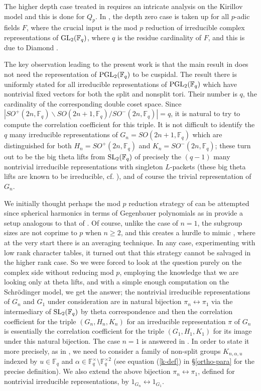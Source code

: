 \documentclass[12pt]{amsart}
\theoremstyle{definition}
\theoremstyle{remark}
\begin{document}
The higher depth case treated in \cite[\S 7]{bhko24} requires an intricate analysis on the Kirillov model and this is done for $Q_p$. In \cite{ana25}, the depth zero case is taken up for all $p$-adic fields $F$, where the crucial input is the mod $p$ reduction of irreducible complex representations of ${\rm GL}_2(\mathbb F_q)$, where $q$ is the residue cardinality of $F$, and this is due to Diamond \cite{dia07}. 

The key observation leading to the present work is that the main result in \cite{ana25} does not need the representation of ${\rm PGL}_2(\mathbb F_q)$ to be cuspidal. The result there is uniformly stated 
for all irreducible representations of ${\rm PGL}_2(\mathbb F_q)$ which have nontrivial fixed vectors for both the split and nonsplit tori. Their number is $q$, the cardinality of the corresponding double coset space. Since $|SO^+(2n,\mathbb F_q) \backslash SO(2n+1,\mathbb F_q)/SO^-(2n,\mathbb F_q)| = q$, it is natural to try to compute the correlation coefficient for this triple. It is not difficult to identify the $q$ many irreducible representations of $G_n = SO(2n+1,\mathbb F_q)$ which are distinguished for both $H_n = SO^+(2n,\mathbb F_q)$ and $K_n = SO^-(2n,\mathbb F_q)$; these turn out to be the big theta lifts from ${\rm SL}_2(\mathbb F_q)$ of precisely the $(q-1)$ many nontrivial irreducible representations with singleton $L$-packets (these big theta lifts are known to be irreducible, cf. \cite{kri24,kri25}), and of course the trivial representation of $G_n$. 

We initially thought perhaps the mod $p$ reduction strategy of \cite{ana25} can be attempted since spherical harmonics in terms of Gegenbauer polynomials as in \cite{bry92} provide a setup analogous to that of \cite{ana25}. Of course, unlike the case of $n=1$, the subgroup sizes are not coprime to $p$ when $n \geq 2$, and this creates a hurdle to mimic \cite{ana25}, where at the very start there is an averaging technique. In any case, experimenting with low rank character tables, it turned out that this strategy cannot be salvaged in the higher rank case. So we were forced to look at the question purely on the complex side without reducing mod $p$, employing the knowledge that we are looking only at theta lifts, and with a simple enough computation on the Schr\"odinger model, we get the answer; the nontrivial irreducible representations of $G_n$ and $G_1$ under consideration are in natural bijection $\pi_n\leftrightarrow\pi_1$ via the intermediary of ${\rm SL}_2(\mathbb F_q)$ by theta correspondence and then the correlation coefficient for the triple $(G_n,H_n,K_n)$ for an irreducible representation $\pi$ of $G_n$ is essentially the correlation coefficient for the triple $(G_1,H_1,K_1)$ for its image under this natural bijection. The case $n=1$ is answered in \cite{ana25}. In order to state it more precisely, as in \cite{ana25}, we need to consider a family of non-split groups $K_{n,\alpha,u}$ indexed by $u \in \mathbb F_q$ and $\alpha \in \mathbb F_q^\times \setminus \mathbb F_q^{\times 2}$ (see equation (\ref{k-def}) in \S \ref{ortho-para} for the precise definition). We also extend the above bijection $\pi_n \leftrightarrow \pi_1$, defined for nontrivial irreducible representations, by $1_{G_n}\leftrightarrow1_{G_1}$.
\end{document}
